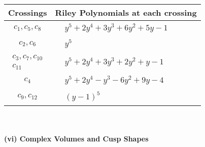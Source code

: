 \documentclass[1p]{elsarticle_modified}
\theoremstyle{definition}
\begin{document}
\begin{tabular}{m{50pt}|m{274pt}}
Crossings & \hspace{64pt}Riley Polynomials at each crossing \\
\hline $$\begin{aligned}c_{1},c_{5},c_{8}\end{aligned}$$&$\begin{aligned}
&y^5+2 y^4+3 y^3+6 y^2+5 y-1
\end{aligned}$\\
\hline $$\begin{aligned}c_{2},c_{6}\end{aligned}$$&$\begin{aligned}
&y^5
\end{aligned}$\\
\hline $$\begin{aligned}c_{3},c_{7},c_{10}\\c_{11}\end{aligned}$$&$\begin{aligned}
&y^5+2 y^4+3 y^3+2 y^2+y-1
\end{aligned}$\\
\hline $$\begin{aligned}c_{4}\end{aligned}$$&$\begin{aligned}
&y^5+2 y^4- y^3-6 y^2+9 y-4
\end{aligned}$\\
\hline $$\begin{aligned}c_{9},c_{12}\end{aligned}$$&$\begin{aligned}
&(y-1)^5
\end{aligned}$\\
\hline
\end{tabular}\\~\\
\newpage\flushleft \textbf{(vi) Complex Volumes and Cusp Shapes}
\end{document}
